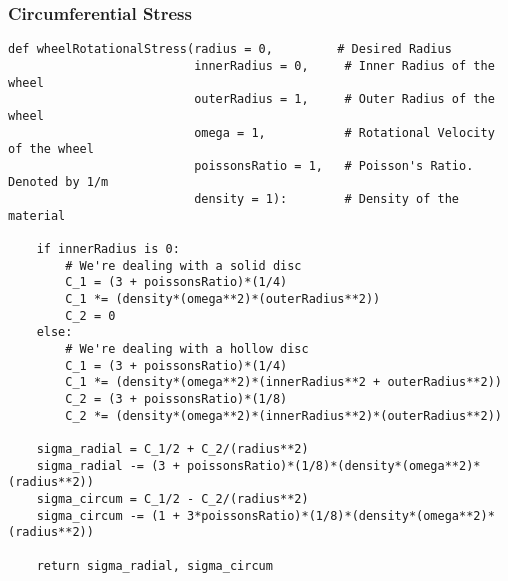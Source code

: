 \documentclass[11pt]{article}
\begin{document}
\subsubsection{Circumferential Stress}
\label{sec:orga109657}
\begin{verbatim}
def wheelRotationalStress(radius = 0,         # Desired Radius
                          innerRadius = 0,     # Inner Radius of the wheel
                          outerRadius = 1,     # Outer Radius of the wheel
                          omega = 1,           # Rotational Velocity of the wheel
                          poissonsRatio = 1,   # Poisson's Ratio. Denoted by 1/m
                          density = 1):        # Density of the material

    if innerRadius is 0:
        # We're dealing with a solid disc
        C_1 = (3 + poissonsRatio)*(1/4)
        C_1 *= (density*(omega**2)*(outerRadius**2))
        C_2 = 0
    else:
        # We're dealing with a hollow disc
        C_1 = (3 + poissonsRatio)*(1/4)
        C_1 *= (density*(omega**2)*(innerRadius**2 + outerRadius**2))
        C_2 = (3 + poissonsRatio)*(1/8)
        C_2 *= (density*(omega**2)*(innerRadius**2)*(outerRadius**2))

    sigma_radial = C_1/2 + C_2/(radius**2)
    sigma_radial -= (3 + poissonsRatio)*(1/8)*(density*(omega**2)*(radius**2))
    sigma_circum = C_1/2 - C_2/(radius**2) 
    sigma_circum -= (1 + 3*poissonsRatio)*(1/8)*(density*(omega**2)*(radius**2))

    return sigma_radial, sigma_circum
\end{verbatim}
\end{document}
